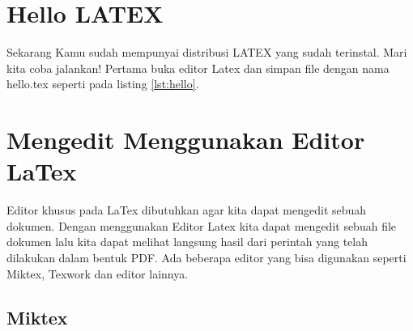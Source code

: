 \section{Hello LATEX}
Sekarang Kamu sudah mempunyai distribusi LATEX yang sudah terinstal. Mari kita coba jalankan! Pertama buka editor Latex dan simpan file dengan nama hello.tex seperti pada listing \ref{lst:hello}.
\cite{kline2018latex}

\section{Mengedit Menggunakan Editor LaTex}
Editor khusus pada LaTex dibutuhkan agar kita dapat mengedit sebuah dokumen. Dengan menggunakan Editor Latex kita dapat mengedit sebuah file dokumen lalu kita dapat melihat langsung hasil dari perintah yang telah dilakukan dalam bentuk PDF. Ada beberapa editor yang bisa digunakan seperti Miktex, Texwork dan editor lainnya.
\subsection{Miktex}


